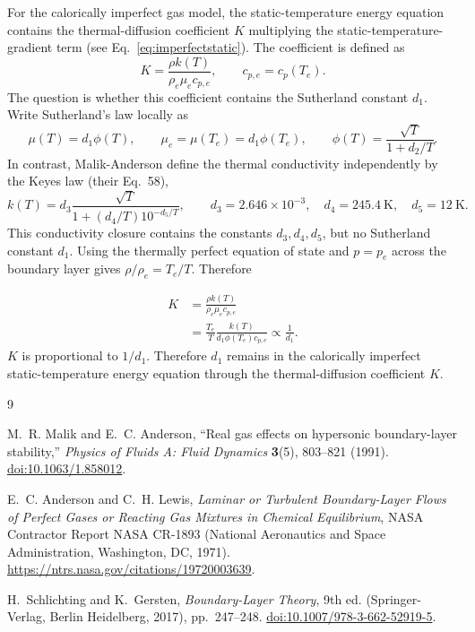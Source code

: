 \documentclass[11pt]{article}
\newcommand{\MA}{Malik-Anderson}
\newcommand{\Te}{T_e}
\newcommand{\rhoe}{\rho_e}
\newcommand{\mue}{\mu_e}
\newcommand{\cpe}{c_{p,e}}
\newcommand{\note}[2]{%
  \vspace{0.3em}%
  \noindent\colorbox{#1}{%
    \begin{minipage}{0.965\linewidth}
      #2
    \end{minipage}}%
  \vspace{0.3em}%
}
\begin{document}
For the calorically imperfect gas model, the static-temperature energy equation contains the thermal-diffusion coefficient \(K\) multiplying the static-temperature-gradient term (see Eq.~\eqref{eq:imperfectstatic}). The coefficient is defined as
\begin{equation}
  K=\frac{\rho k(T)}{\rhoe\mue \cpe},
  \qquad
  \cpe=c_p(\Te).
  \label{eq:K_appendix_def}
\end{equation}
The question is whether this coefficient contains the Sutherland constant \(d_1\). Write Sutherland's law locally as
\begin{equation}
  \mu(T)=d_1\phi(T),
  \qquad
  \mue=\mu(\Te)=d_1\phi(\Te),
  \qquad
  \phi(T)=\frac{\sqrt{T}}{1+d_2/T}.
\end{equation}
In contrast, \MA{} define the thermal conductivity independently by the Keyes law (their Eq.~58),
\begin{equation}
  k(T)
  =
  d_3
  \frac{\sqrt{T}}
       {1+\left(d_4/T\right)10^{-d_5/T}},
  \qquad
  d_3=2.646\times10^{-3},\quad
  d_4=245.4~\mathrm{K},\quad
  d_5=12~\mathrm{K}.
\end{equation}
This conductivity closure contains the constants \(d_3,d_4,d_5\), but no Sutherland constant \(d_1\).
Using the thermally perfect equation of state and \(p=p_e\) across the boundary layer gives \(\rho/\rhoe=\Te/T\). Therefore

\note{HypLightRed}{%
\begin{align}
  K
  &=
  \frac{\rho k(T)}{\rhoe\mue \cpe}
   \\
  &=
  \frac{\Te}{T}
  \frac{k(T)}{d_1\phi(\Te)\cpe}
  \propto \frac{1}{d_1}.
  \label{eq:Kdepends}
\end{align}
\(K\) is proportional to \(1/d_1\). Therefore \(d_1\) remains in the calorically imperfect static-temperature energy equation through the thermal-diffusion coefficient \(K\).
}

\clearpage
\begin{thebibliography}{9}

M.~R. Malik and E.~C. Anderson,
``Real gas effects on hypersonic boundary-layer stability,''
\emph{Physics of Fluids A: Fluid Dynamics} \textbf{3}(5), 803--821 (1991).
\href{https://doi.org/10.1063/1.858012}{doi:10.1063/1.858012}.

E.~C. Anderson and C.~H. Lewis,
\emph{Laminar or Turbulent Boundary-Layer Flows of Perfect Gases or Reacting Gas Mixtures in Chemical Equilibrium},
NASA Contractor Report NASA CR-1893 (National Aeronautics and Space Administration, Washington, DC, 1971).
\url{https://ntrs.nasa.gov/citations/19720003639}.

H.~Schlichting and K.~Gersten,
\emph{Boundary-Layer Theory}, 9th ed. (Springer-Verlag, Berlin Heidelberg, 2017), pp.~247--248.
\href{https://doi.org/10.1007/978-3-662-52919-5}{doi:10.1007/978-3-662-52919-5}.

\end{thebibliography}
\end{document}
